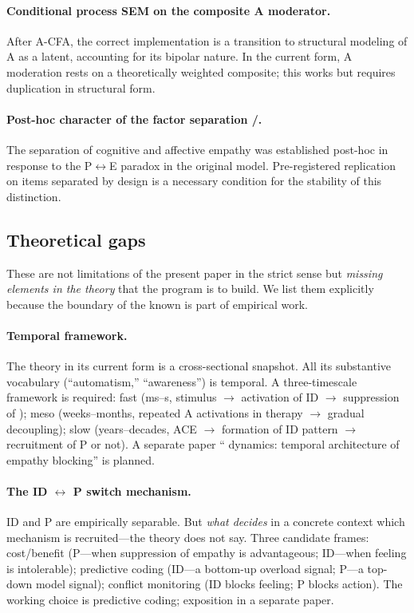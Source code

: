 \paragraph{Conditional process SEM on the composite A moderator.} After A-CFA, the correct implementation is a transition to structural modeling of A as a latent, accounting for its bipolar nature. In the current form, A moderation rests on a theoretically weighted composite; this works but requires duplication in structural form.

\paragraph{Post-hoc character of the factor separation \EAF{}/\Ecog{}.} The separation of cognitive and affective empathy was established post-hoc in response to the P$\leftrightarrow$E paradox in the original model. Pre-registered replication on items separated by design is a necessary condition for the stability of this distinction.

\subsection{Theoretical gaps}

These are not limitations of the present paper in the strict sense but \emph{missing elements in the theory} that the program is to build. We list them explicitly because the boundary of the known is part of empirical work.

\paragraph{Temporal framework.} The theory in its current form is a cross-sectional snapshot. All its substantive vocabulary (``automatism,'' ``awareness'') is temporal. A three-timescale framework is required: fast (ms--s, stimulus $\to$ activation of ID $\to$ suppression of \EAF{}); meso (weeks--months, repeated A activations in therapy $\to$ gradual decoupling); slow (years--decades, ACE $\to$ formation of ID pattern $\to$ recruitment of P or not). A separate paper ``\DEIC{} dynamics: temporal architecture of empathy blocking'' is planned.

\paragraph{The ID $\leftrightarrow$ P switch mechanism.} ID and P are empirically separable. But \emph{what decides} in a concrete context which mechanism is recruited---the theory does not say. Three candidate frames: cost/benefit (P---when suppression of empathy is advantageous; ID---when feeling is intolerable); predictive coding (ID---a bottom-up overload signal; P---a top-down model signal); conflict monitoring (ID blocks feeling; P blocks action). The working choice is predictive coding; exposition in a separate paper.


